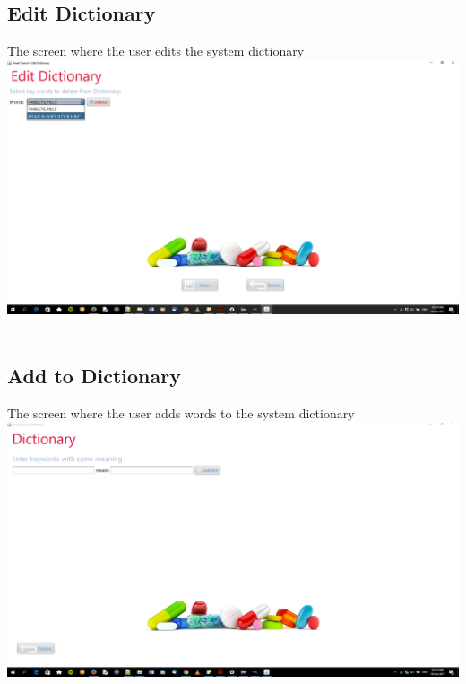 \documentclass[a4paper,10pt]{article}
\begin{document}
	\subsection{Edit Dictionary}
	The screen where the user edits the system dictionary  \\
	{\centering\includegraphics[width=15cm, scale=0.5]{6.png}} \\ \\

	\subsection{Add to Dictionary}
	The screen where the user adds words to the system dictionary  \\
	{\centering\includegraphics[width=15cm, scale=0.5]{4.png}} \\ \\
\end{document}
